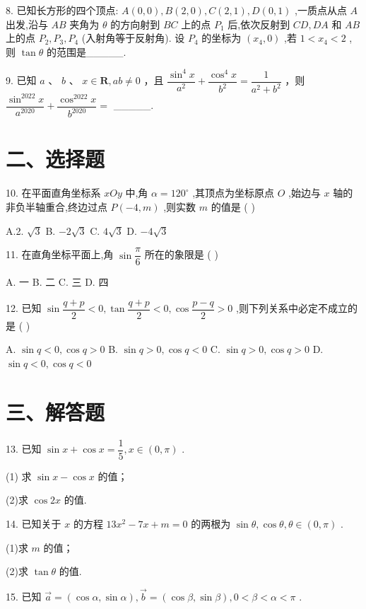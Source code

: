 8. 已知长方形的四个顶点: $A\left( {0,0}\right) ,B\left( {2,0}\right) ,C\left( {2,1}\right) ,D\left( {0,1}\right)$ ,一质点从点 $A$ 出发,沿与 ${AB}$ 夹角为 $\theta$ 的方向射到 ${BC}$ 上的点 ${P}_{1}$ 后,依次反射到 ${CD},{DA}$ 和 ${AB}$ 上的点 ${P}_{2},{P}_{3},{P}_{4}$ (入射角等于反射角). 设 ${P}_{4}$ 的坐标为 $\left( {{x}_{4},0}\right)$ ,若 $1 < {x}_{4} < 2$ ,则 $\tan \theta$ 的范围是\_\_\_\_\_.

9. 已知 $a$ 、 $b$ 、 $x \in  \mathbf{R},{ab} \neq  0$ ，且 $\dfrac{{\sin }^{4}x}{{a}^{2}} + \dfrac{{\cos }^{4}x}{{b}^{2}} = \dfrac{1}{{a}^{2} + {b}^{2}}$ ，则 $\dfrac{{\sin }^{2022}x}{{a}^{2020}} + \dfrac{{\cos }^{2022}x}{{b}^{2020}} =$ \_\_\_\_\_.

\section*{二、选择题}

10. 在平面直角坐标系 ${xOy}$ 中,角 $\alpha  = {120}^{ \circ  }$ ,其顶点为坐标原点 $O$ ,始边与 $x$ 轴的非负半轴重合,终边过点 $P\left( {-4,m}\right)$ ,则实数 $m$ 的值是 ( )

A.2. $\sqrt{3}$ B. $- 2\sqrt{3}$ C. $4\sqrt{3}$ D. $- 4\sqrt{3}$

11. 在直角坐标平面上,角 $\sin \dfrac{\pi }{6}$ 所在的象限是 ( )

A. 一 B. 二 C. 三 D. 四

12. 已知 $\sin \dfrac{q + p}{2} < 0,\tan \dfrac{q + p}{2} < 0,\cos \dfrac{p - q}{2} > 0$ ,则下列关系中必定不成立的是 ( )

A. $\sin q < 0,\cos q > 0$ B. $\sin q > 0,\cos q < 0$ C. $\sin q > 0,\cos q > 0$ D. $\sin q < 0,\cos q < 0$

\section*{三、解答题}

13. 已知 $\sin x + \cos x = \dfrac{1}{5},x \in  \left( {0,\pi }\right)$ .

(1) 求 $\sin x - \cos x$ 的值；

(2)求 $\cos {2x}$ 的值.

14. 已知关于 $x$ 的方程 ${13}{x}^{2} - {7x} + m = 0$ 的两根为 $\sin \theta ,\cos \theta ,\theta  \in  \left( {0,\pi }\right)$ .

(1)求 $m$ 的值；

(2)求 $\tan \theta$ 的值.

15. 已知 $\overrightarrow{a} = \left( {\cos \alpha ,\sin \alpha }\right) ,\overrightarrow{b} = \left( {\cos \beta ,\sin \beta }\right) ,0 < \beta  < \alpha  < \pi$ .

